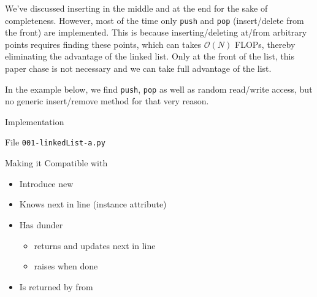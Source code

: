 
\begin{frame}
%
\begin{hintbox}
We've discussed inserting in the middle and at the end for the sake of completeness. However, most of the time only \texttt{push} and \texttt{pop} (insert/delete from the front) are implemented. This is because inserting/deleting at/from arbitrary points requires finding these points, which can takes $\mathcal{O}(N)$ FLOPs, thereby eliminating the advantage of the linked list. Only at the front of the list, this paper chase is not necessary and we can take full advantage of the list.

In the example below, we find \texttt{push}, \texttt{pop} as well as random read/write access, but no generic insert/remove method for that very reason.
\end{hintbox}
%
\end{frame}


\begin{frame}[fragile]{Implementation}
%
\begin{center}
\begin{Large}
	File \texttt{001-linkedList-a.py}
\end{Large}
\end{center}
%
\end{frame}



\begin{frame}[fragile]{Making it Compatible with }
%
\begin{itemize}
\item Introduce new 
\item Knows next in line (instance attribute)
\item Has dunder 
	\begin{itemize}
	\item returns and updates next in line
	\item raises  when done
	\end{itemize}
\item Is returned by  from 
\end{itemize}
%
\end{frame}

